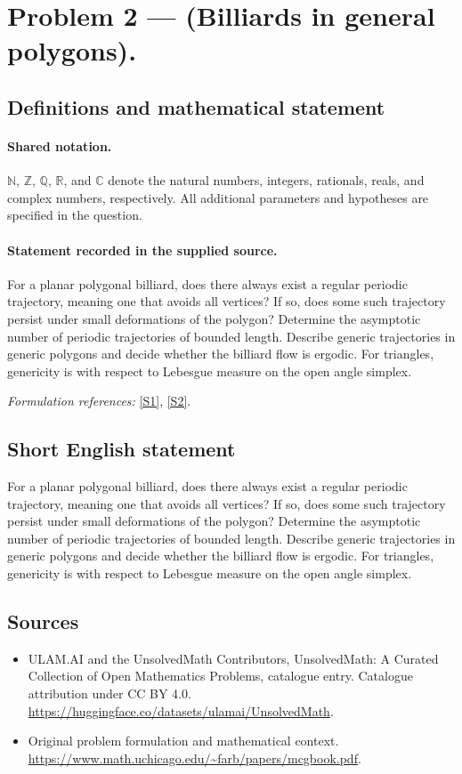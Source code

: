\documentclass[11pt]{article}
\newcommand{\sref}[2]{\hyperlink{source:#1:#2}{[S#2]}}
\begin{document}
\section{Problem 2 — (Billiards in general polygons).}\label{statement}

\subsection{Definitions and mathematical statement}

\paragraph{Shared notation.}$\mathbb N$, $\mathbb Z$, $\mathbb Q$, $\mathbb R$, and $\mathbb C$ denote the natural numbers, integers, rationals, reals, and complex numbers, respectively. All additional parameters and hypotheses are specified in the question.


\paragraph{Statement recorded in the supplied source.}
For a planar polygonal billiard, does there always exist a regular periodic trajectory, meaning one that avoids all vertices? If so, does some such trajectory persist under small deformations of the polygon? Determine the asymptotic number of periodic trajectories of bounded length. Describe generic trajectories in generic polygons and decide whether the billiard flow is ergodic. For triangles, genericity is with respect to Lebesgue measure on the open angle simplex.
\par\smallskip\textit{Formulation references:} \sref{statement}{1}, \sref{statement}{2}.
\subsection{Short English statement}
For a planar polygonal billiard, does there always exist a regular periodic trajectory, meaning one that avoids all vertices? If so, does some such trajectory persist under small deformations of the polygon? Determine the asymptotic number of periodic trajectories of bounded length. Describe generic trajectories in generic polygons and decide whether the billiard flow is ergodic. For triangles, genericity is with respect to Lebesgue measure on the open angle simplex.
\subsection{Sources}
\begin{itemize}
\item[\hypertarget{source:statement:1}{S1}] ULAM.AI and the UnsolvedMath Contributors, UnsolvedMath: A Curated Collection of Open Mathematics Problems, catalogue entry. Catalogue attribution under CC BY 4.0.
\url{https://huggingface.co/datasets/ulamai/UnsolvedMath}.
\item[\hypertarget{source:statement:2}{S2}] Original problem formulation and mathematical context.
\url{https://www.math.uchicago.edu/~farb/papers/mcgbook.pdf}.
\end{itemize}
\label{end:statement}
\end{document}
